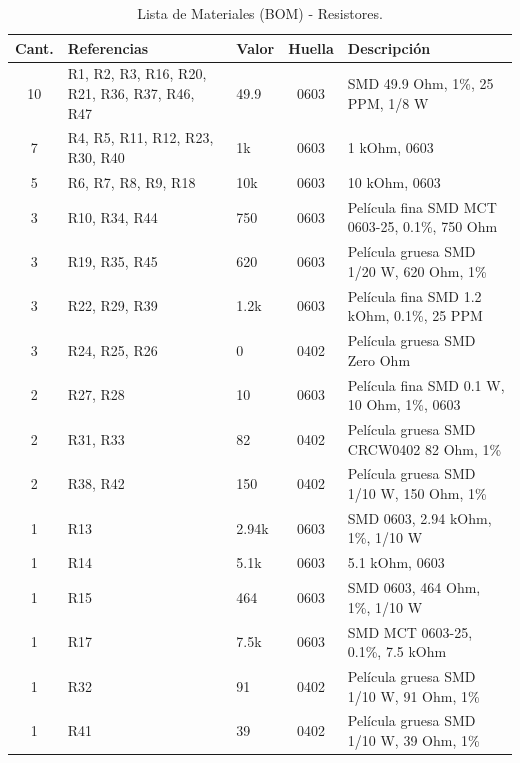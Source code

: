 \documentclass[11pt,a4paper,twoside]{report}
\begin{document}
	\begin{table}
		\centering
		\small
		\begin{tabularx}{\textwidth}{c p{5cm} l c X}
			\toprule
			\textbf{Cant.} & \textbf{Referencias} & \textbf{Valor} & \textbf{Huella} & \textbf{Descripción} \\
			\midrule
			10 & R1, R2, R3, R16, R20, R21, R36, R37, R46, R47 & 49.9 & 0603 & SMD 49.9 Ohm, 1\%, 25 PPM, 1/8 W \\
			7 & R4, R5, R11, R12, R23, R30, R40 & 1k & 0603 & 1 kOhm, 0603 \\
			5 & R6, R7, R8, R9, R18 & 10k & 0603 & 10 kOhm, 0603 \\
			3 & R10, R34, R44 & 750 & 0603 & Película fina SMD MCT 0603-25, 0.1\%, 750 Ohm \\
			3 & R19, R35, R45 & 620 & 0603 & Película gruesa SMD 1/20 W, 620 Ohm, 1\% \\
			3 & R22, R29, R39 & 1.2k & 0603 & Película fina SMD 1.2 kOhm, 0.1\%, 25 PPM \\
			3 & R24, R25, R26 & 0 & 0402 & Película gruesa SMD Zero Ohm \\
			2 & R27, R28 & 10 & 0603 & Película fina SMD 0.1 W, 10 Ohm, 1\%, 0603 \\
			2 & R31, R33 & 82 & 0402 & Película gruesa SMD CRCW0402 82 Ohm, 1\% \\
			2 & R38, R42 & 150 & 0402 & Película gruesa SMD 1/10 W, 150 Ohm, 1\% \\
			1 & R13 & 2.94k & 0603 & SMD 0603, 2.94 kOhm, 1\%, 1/10 W \\
			1 & R14 & 5.1k & 0603 & 5.1 kOhm, 0603 \\
			1 & R15 & 464 & 0603 & SMD 0603, 464 Ohm, 1\%, 1/10 W \\
			1 & R17 & 7.5k & 0603 & SMD MCT 0603-25, 0.1\%, 7.5 kOhm \\
			1 & R32 & 91 & 0402 & Película gruesa SMD 1/10 W, 91 Ohm, 1\% \\
			1 & R41 & 39 & 0402 & Película gruesa SMD 1/10 W, 39 Ohm, 1\% \\
			\bottomrule
		\end{tabularx}
		\caption{Lista de Materiales (BOM) - Resistores.}
		\label{tab:bom_resistores}
		\end{table}
			
			
			
\end{document}

